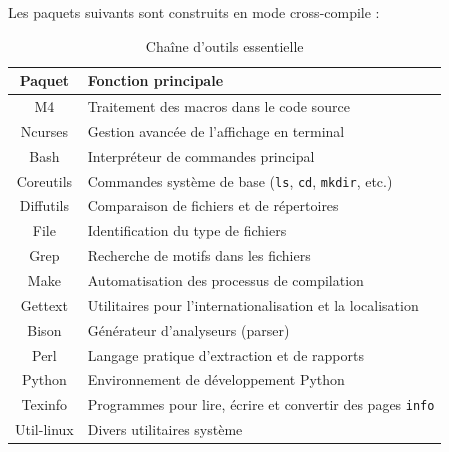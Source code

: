 Les paquets suivants sont construits en mode cross-compile :
\begin{table}[H]
    \centering
    \begin{tabular}{|c|p{8cm}|}
        \hline
        \textbf{Paquet} & \textbf{Fonction principale} \\
        \hline
        M4               & Traitement des macros dans le code source \\
        \hline
        Ncurses             & Gestion avancée de l’affichage en terminal \\
        \hline
        Bash              & Interpréteur de commandes principal \\
        \hline
        Coreutils             & Commandes système de base (\texttt{ls}, \texttt{cd}, \texttt{mkdir}, etc.) \\
        \hline
        Diffutils            & Comparaison de fichiers et de répertoires \\
        \hline
        File                & Identification du type de fichiers \\
        \hline
        Grep              & Recherche de motifs dans les fichiers \\
        \hline
        Make               & Automatisation des processus de compilation \\
        \hline
        Gettext              & Utilitaires pour l’internationalisation et la localisation \\
        \hline
        Bison              & Générateur d’analyseurs (parser) \\
        \hline
        Perl              & Langage pratique d’extraction et de rapports \\
        \hline
        Python           & Environnement de développement Python \\
        \hline
        Texinfo             & Programmes pour lire, écrire et convertir des pages \texttt{info} \\
        \hline
        Util-linux        & Divers utilitaires système \\
        \hline
    \end{tabular}
    \caption{Chaîne d’outils essentielle}
    \label{tab:toolchain}
\end{table}

